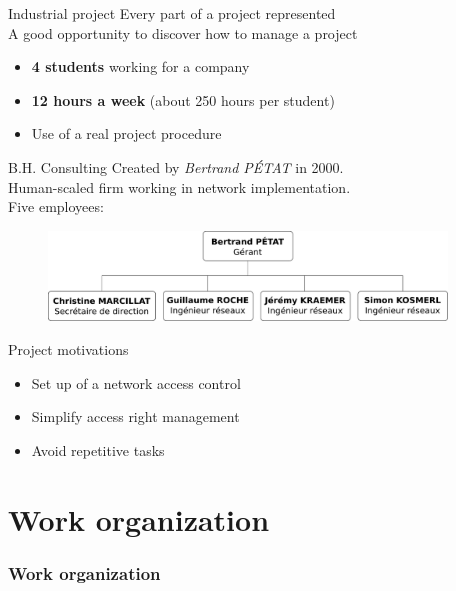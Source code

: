 \documentclass[12pt]{beamer}
\begin{document}
\begin{frame}{Industrial project}
    Every part of a project represented\\
    \vfill
    A good opportunity to discover how to manage a project
    \vfill
    \begin{itemize}
	\item \textbf{4 students} working for a company
	\item \textbf{12 hours a week} (about 250 hours per student)
	\item Use of a real project procedure
    \end{itemize}
\end{frame}


    
\begin{frame}{B.H. Consulting}
    Created by \emph{Bertrand PÉTAT} in 2000.\\
    \vfill
    Human-scaled firm working in network implementation.\\
    \vfill
    Five employees:
    \begin{figure}
	\includegraphics[width=300pt]{img/organigramme.pdf}
    \end{figure}
\end{frame}


\begin{frame}{Project motivations}
    \begin{itemize}
	\item<1->Set up of a network access control 
	\vfill
	\item<2->Simplify access right management
	\vfill
	\item<3->Avoid repetitive tasks
    \end{itemize}

\end{frame}
    
\part{Work organization}
\frame{\partpage}
\section{Work organization}
\end{document}
